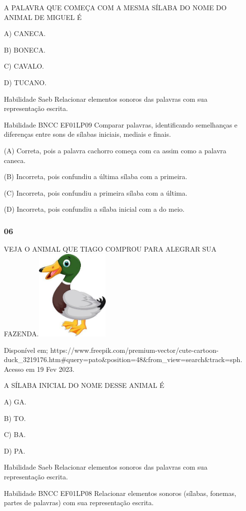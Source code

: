 \begin{escola}
A PALAVRA QUE COMEÇA COM A MESMA SÍLABA DO NOME DO ANIMAL DE MIGUEL É

A) CANECA.

B) BONECA.

C) CAVALO.

D) TUCANO.

Habilidade Saeb Relacionar elementos sonoros das palavras com sua
representação escrita.

Habilidade BNCC EF01LP09 Comparar palavras, identificando semelhanças e
diferenças entre sons de sílabas iniciais, mediais e finais.

(A) Correta, pois a palavra cachorro começa com ca assim como a palavra
caneca.

(B) Incorreta, pois confundiu a última sílaba com a primeira.

(C) Incorreta, pois confundiu a primeira sílaba com a última.

(D) Incorreta, pois confundiu a sílaba inicial com a do meio.

\subsubsection{06}\label{section-46}

VEJA O ANIMAL QUE TIAGO COMPROU PARA ALEGRAR SUA
FAZENDA.\includegraphics[width=1.43478in,height=1.76408in]{media/image215.jpg}

Disponível em;
https://www.freepik.com/premium-vector/cute-cartoon-duck\_3219176.htm\#query=pato\&position=48\&from\_view=search\&track=sph.
Acesso em 19 Fev 2023.

A SÍLABA INICIAL DO NOME DESSE ANIMAL É

A) GA.

B) TO.

C) BA.

D) PA.

Habilidade Saeb Relacionar elementos sonoros das palavras com sua
representação escrita.

Habilidade BNCC EF01LP08 Relacionar elementos sonoros (sílabas, fonemas,
partes de palavras) com sua representação escrita.


\end{escola}
